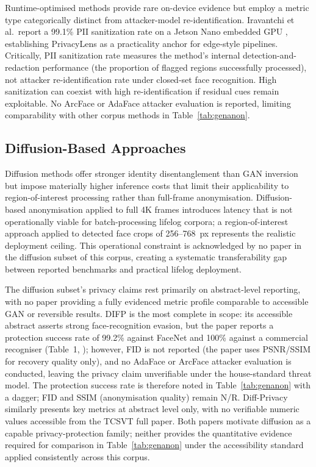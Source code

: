 \documentclass[12pt, onecolumn]{IEEEtran}
\begin{document}
Runtime-optimised methods provide rare on-device evidence but employ a
metric type categorically distinct from attacker-model
re-identification. Iravantchi et al.\ report a 99.1\% PII sanitization
rate on a Jetson Nano embedded GPU
\cite{iravantchi2024privacylens}, establishing PrivacyLens as a
practicality anchor for edge-style pipelines. Critically, PII
sanitization rate measures the method's internal
detection-and-redaction performance (the proportion of flagged regions
successfully processed), not attacker re-identification rate under
closed-set face recognition. High sanitization can coexist with high
re-identification if residual cues remain exploitable. No ArcFace or
AdaFace attacker evaluation is reported, limiting comparability with
other corpus methods in Table~\ref{tab:genanon}.

\subsection{Diffusion-Based Approaches}

Diffusion methods offer stronger identity disentanglement than GAN
inversion but impose materially higher inference costs that limit their
applicability to region-of-interest processing rather than full-frame
anonymisation. Diffusion-based anonymisation applied to full 4K frames
introduces latency that is not operationally viable for batch-processing
lifelog corpora; a region-of-interest approach applied to detected face
crops of 256--768~px represents the realistic deployment ceiling. This
operational constraint is acknowledged by no paper in the diffusion
subset of this corpus, creating a systematic transferability gap between
reported benchmarks and practical lifelog deployment.

The diffusion subset's privacy claims rest primarily on abstract-level
reporting, with no paper providing a fully evidenced metric profile
comparable to accessible GAN or reversible results. DIFP
\cite{you2024difp} is the most complete in scope: its accessible
abstract asserts strong face-recognition evasion, but the paper reports a protection success rate 
of 99.2\% against FaceNet and 100\% against a commercial 
recogniser (Table~1, \cite{you2024difp}); however, FID is 
not reported (the paper uses PSNR/SSIM for recovery quality 
only), and no AdaFace or ArcFace attacker evaluation is 
conducted, leaving the privacy claim unverifiable under the 
house-standard threat model. The protection success rate is therefore
noted in Table~\ref{tab:genanon} with a dagger; FID and SSIM
(anonymisation quality) remain N/R.
Diff-Privacy \cite{he2024diffprivacy} similarly presents key metrics at
abstract level only, with no verifiable numeric values accessible from
the TCSVT full paper. Both papers motivate diffusion as a capable
privacy-protection family; neither provides the quantitative evidence
required for comparison in Table~\ref{tab:genanon} under the
accessibility standard applied consistently across this corpus.
\end{document}
